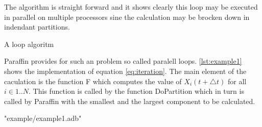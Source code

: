 \documentclass[justified]{tufte-book}
\numberwithin{equation}{subsection}
\begin{document}
The algorithm is straight forward and it shows clearly this loop 
may be executed in parallel on multiple processors sine the calculation 
may be brocken down in indendant partitions.

\begin{algorithm}
\caption{A loop algoritm}
\label{alg:loop}
\begin{algorithmic}
\EndFor
\end{algorithmic}
\end{algorithm}

Paraffin provides for such an problem so called paralell loops. \autoref{lst:example1}
shows the implementation of equation \autoref{eq:iteration}. The main element of the 
caculation is the function F which computes the value of \begin{math} 
X_i(t+ \bigtriangleup t) \end{math} for all \begin{math}i \in 1..N\end{math}. 
This function is called by the function Do{\textunderscore}Partition which in turn is called by Paraffin with the smallest and the largest component to be calculated.

 
\begin{listing}

    {"example/example1.adb"}
\end{listing}
\end{document}
